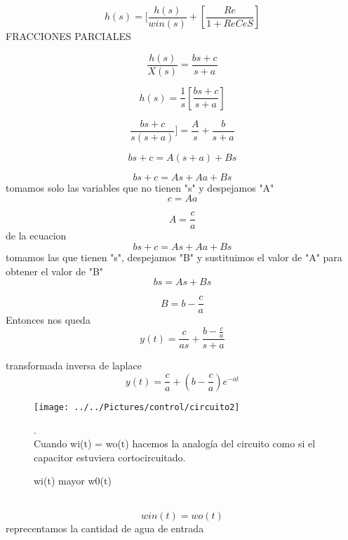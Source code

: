 \documentclass{article}
\begin{document}
\begin{equation}
h(s)=[\frac{h(s)}{win(s)} + [\frac{Re} {1+ReCeS}]
\end{equation}
FRACCIONES PARCIALES

\begin{equation}
\frac{h(s)}{X(s)}=\frac{bs+c}{s+a}
\end{equation}

\begin{equation}
h(s)=\frac{1}{s}[\frac{bs+c}{s+a}]
\end{equation}

\begin{equation}
\frac{bs+c}{s(s+a)}]=\frac{A}{s}+\frac{b}{s+a}
\end{equation}

\begin{equation}
bs+c=A(s+a)+Bs
\end{equation}

\begin{equation}
bs+c=As+Aa+Bs
\end{equation}
tomamos solo las variables que no tienen "s" y despejamos "A"
\begin{equation}
c=Aa
\end{equation}

\begin{equation}
A=\frac{c}{a}
\end{equation}
de la ecuacion
\begin{equation}
bs+c=As+Aa+Bs
\end{equation}
tomamos las que tienen "s", despejamos "B" y sustituimos el valor de "A" para obtener el valor de "B"
\begin{equation}
bs=As+Bs
\end{equation}

\begin{equation}
B=b-\frac{c}{a}
\end{equation}
Entonces nos queda 
\begin{equation}
y(t)=\frac{c}{as}+\frac{b-\frac{c}{a}}{s+a}
\end{equation}

transformada inversa de laplace
\begin{equation}
y(t)=\frac{c}{a}+(b-\frac{c}{a})e^{-at}
\end{equation}

\begin{figure}[h!]
	\centering
\texttt{[image: ../../Pictures/control/circuito2]}
	\caption{wi(t) mayor w0(t)}.\\
	Cuando wi(t) = wo(t) hacemos la analogía del circuito como si el capacitor estuviera cortocircuitado.
\end{figure}\\
\begin{equation}
win(t)=wo(t)
\end{equation}
reprecentamos la cantidad de agua de entrada
\end{document}
